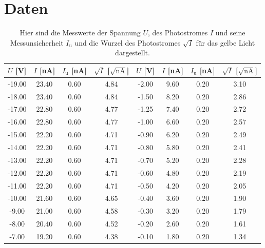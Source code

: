 \documentclass[titlepage = firstcover]{scrartcl}
\begin{document}
    \section{Daten}
    \FloatBarrier
        \begin{table}[h]
          \centering
          \caption{Hier sind die Messwerte der Spannung $U$, des Photostromes $I$ und seine Messunsicherheit $I_{\text{u}}$ und die Wurzel des Photostromes $\sqrt{I}$ für das gelbe Licht dargestellt.}
          \label{tab:gelbesLicht}
          \begin{tabular}{c c c c c c c c}
            \toprule
            {$U$ [V]} & {$I$ [nA]} & {$I_{\text{u}}$ [nA]} & {$\sqrt{I}$ [$\sqrt{\text{nA}}$]} & {$U$ [V]} & {$I$ [nA]} & {$I_{\text{u}}$ [nA]} & {$\sqrt{I}$ [$\sqrt{\text{nA}}$]} \\
            \midrule
            -19.00   &   23.40   &   0.60   &   4.84   &  -2.00   &    9.60   &   0.20   &   3.10 \\
            -18.00   &   23.40   &   0.60   &   4.84   &  -1.50   &    8.20   &   0.20   &   2.86 \\
            -17.00   &   22.80   &   0.60   &   4.77   &  -1.25   &    7.40   &   0.20   &   2.72 \\
            -16.00   &   22.80   &   0.60   &   4.77   &  -1.00   &    6.60   &   0.20   &   2.57 \\
            -15.00   &   22.20   &   0.60   &   4.71   &  -0.90   &    6.20   &   0.20   &   2.49 \\
            -14.00   &   22.20   &   0.60   &   4.71   &  -0.80   &    5.80   &   0.20   &   2.41 \\
            -13.00   &   22.20   &   0.60   &   4.71   &  -0.70   &    5.20   &   0.20   &   2.28 \\
            -12.00   &   22.20   &   0.60   &   4.71   &  -0.60   &    4.80   &   0.20   &   2.19 \\
            -11.00   &   22.20   &   0.60   &   4.71   &  -0.50   &    4.20   &   0.20   &   2.05 \\
            -10.00   &   21.60   &   0.60   &   4.65   &  -0.40   &    3.60   &   0.20   &   1.90 \\
             -9.00   &   21.00   &   0.60   &   4.58   &  -0.30   &    3.20   &   0.20   &   1.79 \\
             -8.00   &   20.40   &   0.60   &   4.52   &  -0.20   &    2.60   &   0.20   &   1.61 \\
             -7.00   &   19.20   &   0.60   &   4.38   &  -0.10   &    1.80   &   0.20   &   1.34 \\

\end{tabular}
\end{table}
\end{document}
